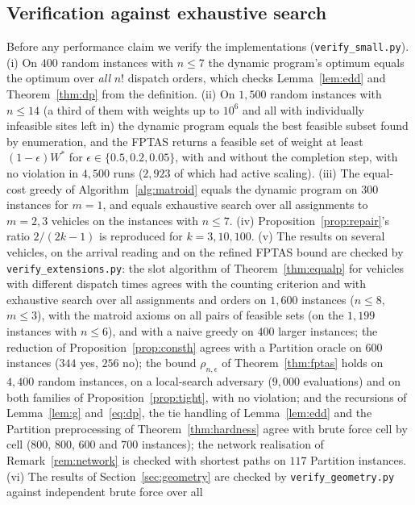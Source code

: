\documentclass[pdflatex,sn-mathphys-ay]{sn-jnl}
\theoremstyle{thmstyleone}
\theoremstyle{thmstyletwo}
\theoremstyle{thmstylethree}
\begin{document}
\subsection{Verification against exhaustive search}\label{sec:verify}

Before any performance claim we verify the implementations
(\texttt{verify\_small.py}). (i) On $400$ random instances with $n\le7$
the dynamic program's optimum equals the optimum over \emph{all} $n!$
dispatch orders, which checks Lemma~\ref{lem:edd} and
Theorem~\ref{thm:dp} from the definition. (ii) On $1{,}500$ random
instances with $n\le14$ (a third of them with weights up to $10^6$ and
all with individually infeasible sites left in) the dynamic program
equals the best feasible subset found by enumeration, and the FPTAS
returns a feasible set of weight at least $(1-\epsilon)W^\ast$ for
$\epsilon\in\{0.5,0.2,0.05\}$, with and without the completion step, with
no violation in $4{,}500$ runs ($2{,}923$ of which had active scaling).
(iii) The equal-cost greedy of Algorithm~\ref{alg:matroid} equals the
dynamic program on $300$ instances for $m=1$, and equals exhaustive
search over all assignments to $m=2,3$ vehicles on the instances with
$n\le7$. (iv) Proposition~\ref{prop:repair}'s ratio $2/(2k-1)$ is
reproduced for $k=3,10,100$. (v) The results on several vehicles, on the arrival reading and on the refined
FPTAS bound are checked by
\texttt{verify\_extensions.py}: the slot algorithm of
Theorem~\ref{thm:equalp} for vehicles with different dispatch times agrees
with the counting criterion and with exhaustive search over all
assignments and orders on $1{,}600$ instances ($n\le8$, $m\le3$), with the
matroid axioms on all pairs of feasible sets (on the $1{,}199$ instances with $n\le6$), and with a naive greedy on
$400$ larger instances; the reduction of
Proposition~\ref{prop:consth} agrees with a Partition oracle on $600$
instances ($344$ yes, $256$ no); the bound $\rho_{n,\epsilon}$ of
Theorem~\ref{thm:fptas} holds on $4{,}400$ random instances, on a
local-search adversary ($9{,}000$ evaluations) and on both families of
Proposition~\ref{prop:tight}, with no violation; and the recursions of
Lemma~\ref{lem:g} and~\eqref{eq:dp}, the tie handling of
Lemma~\ref{lem:edd} and the Partition preprocessing of
Theorem~\ref{thm:hardness} agree with brute force cell by cell
($800$, $800$, $600$ and $700$ instances); the network realisation of
Remark~\ref{rem:network} is checked with shortest paths on $117$ Partition
instances. (vi) The results of Section~\ref{sec:geometry} are checked by
\texttt{verify\_geometry.py} against independent brute force over all
\end{document}
